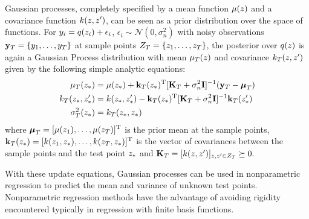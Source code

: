 Gaussian processes, completely specified by a mean function $\mu(z)$ and a covariance function $k(z,z')$, can be seen as a prior distribution over the space of functions. For $y_i = q(z_i) + \epsilon_i$, $\epsilon_i \sim \mathcal{N}(0,\sigma_{n}^{2})$ with noisy observations $\mathbf{y}_{T} = \{y_1,\ldots,y_T\}$ at sample points $Z_{T} = \{z_1,\ldots,z_T\}$, the posterior over $q(z)$ is again a Gaussian Process distribution with mean $\mu_T{(z)}$ and covariance $k_T(z,z')$ given by the following simple analytic equations:
\begin{align}
\mu_T{(z_{*})} &= \mu(z_{*}) + \mathbf{k}_T(z_{*})^{\mathrm{T}}[\mathbf{K}_T + \sigma_{n}^{2}\mathbf{I}]^{-1}(\mathbf{y}_T - \boldsymbol{\mu}_T) \label{gpUpdate_mu} \\ 
k_T(z_{*},z'_{*}) &= k(z_{*},z'_{*}) - \mathbf{k}_T(z_{*})^{\mathrm{T}}[\mathbf{K}_T + \sigma_{n}^{2}\mathbf{I}]^{-1} \mathbf{k}_T(z'_{*}) \label{gpUpdate_covar} \\
\sigma_T^{2}(z_{*}) &= k_T(z_{*},z_{*}) \label{gpUpdate_sigma}
\end{align}
where $\boldsymbol{\mu}_T = [\mu(z_1),\ldots,\mu(z_T)]^\mathrm{T}$ is the prior mean at the sample points, $\mathbf{k}_T(z_{*}) = [k(z_1,z_{*}),\ldots,k(z_T,z_{*})]^\mathrm{T}$ is the vector of covariances between the sample points and the test point $z_{*}$ and $\mathbf{K}_T = [k(z,z')]_{z,z' \in Z_T} \succeq 0.$


With these update equations, Gaussian processes can be used in nonparametric regression to predict the mean and variance of unknown test points. Nonparametric regression methods have the advantage of avoiding rigidity
encountered typically in regression with finite basis functions. 

